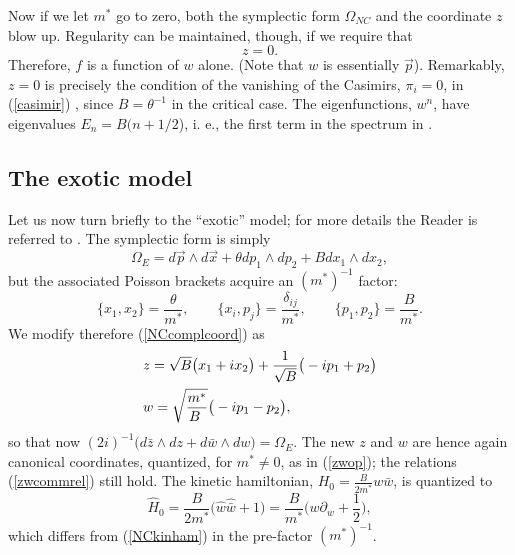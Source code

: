 \documentclass[a4paper,11pt]{article}
\newcommand{\half}{{\scriptstyle{\frac{1}{2}}}}
\newcommand{\vx}{{\vec x}}
\def\p{{\partial}}
\def\vp{{\vec p}}
\def\vx{{\vec x}}
\begin{document}
Now if we let $m^*$ go to zero, both the symplectic form
$\Omega_{NC}$ and
the coordinate $z$ blow up. Regularity can be maintained, though,
if we require that
\begin{equation}
     z=0.
     \label{NCcondition}
\end{equation}
Therefore, $f$ is a function of $w$ alone.
(Note that $w$ is essentially $\vp$).
Remarkably, $z=0$ is precisely the condition of the vanishing
of the Casimirs, $\pi_{i}=0$,  in (\ref{casimir}) \cite{BNS, Sochi},
since $B=\theta^{-1}$ in the critical case.
The eigenfunctions,  $w^n$, have
eigenvalues $E_{n}=B(n+1/2$), i. e.,  the first term in
the spectrum in \cite{BNS}.

\subsection{The exotic model}

Let us now turn briefly to the ``exotic'' model;
for more details the Reader is referred to \cite{DH}.
The symplectic form is simply
\begin{equation}
     \Omega_{E}=
     d\vp\wedge d\vx+\theta dp_{1}\wedge dp_{2} +
     B dx_{1}\wedge dx_{2},
     \label{Esymp}
\end{equation}
but the associated Poisson brackets
acquire an $(m^*)^{-1}$ factor:
\begin{equation}
	\{x_{1}, x_{2}\}=\frac{\theta}{m^*},
	\qquad
	\{x_{i},p_{j}\}=\frac{\delta_{ij}}{m^*},
	\qquad
	\{p_{1}, p_{2}\}=\frac{B}{m^*}.
  \label{Erel}
\end{equation}
We modify therefore (\ref{NCcomplcoord}) as
\begin{equation}
     \begin{array}{ll}
     z=\sqrt{B}\big(x_{1}+ix_{2}\big)
     +
     \displaystyle\frac{1}{\sqrt{B}}\big(-ip_{1}+p_{2}\big)
     \hfill\\[10pt]
     w=\displaystyle\sqrt{\frac{m^*}{B\ }}\big(-ip_{1}-p_{2}\big),\hfill\\
     \end{array}
     \label{Ecomplcoord}
\end{equation}
so that  now
$(2i)^{-1}\big({d\bar{z}\wedge dz+ d\bar{w}\wedge dw}\big)=
     \Omega_{E}$.
The new $z$ and $w$ are hence again canonical coordinates, quantized,
for $m^*\neq0$, as in (\ref{zwop}); the relations
(\ref{zwcommrel})  still hold. The kinetic hamiltonian,
$H_{0}=\frac{B}{2m^*}w\bar{w}$, is quantized to
\begin{equation}
     \widehat{H}_{0}=\frac{B}{2m^*}\big(\widehat{w}\widehat{\bar{w}}+1\big)
     =
     \frac{B}{m^*}\big(w\p_{w}+\half\big),
     \label{kinham}
\end{equation}
which differs from (\ref{NCkinham}) in the
pre-factor $(m^*)^{-1}$.
\end{document}
